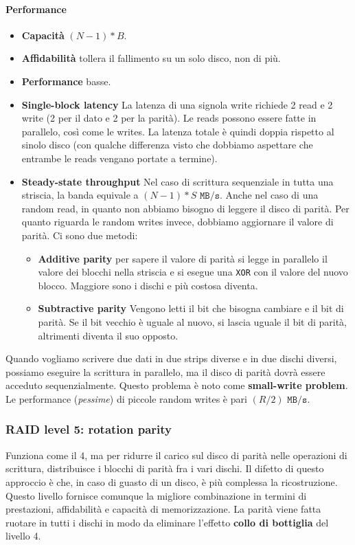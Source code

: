 \documentclass[12pt, letterpaper]{article}
\begin{document}
				\paragraph{Performance}
					\begin{itemize}
						\item \textbf{Capacità} $(N-1)*B$.
						\item \textbf{Affidabilità} tollera il fallimento su un solo disco, non di più.
						\item \textbf{Performance} basse.
						\item \textbf{Single-block latency} La latenza di una signola write richiede 2 read e 2 write (2 per il dato e 2 per la parità). Le reads possono essere fatte in parallelo, così come le writes. La latenza totale è quindi doppia rispetto al sinolo disco (con qualche differenza visto che dobbiamo aspettare che entrambe le reads vengano portate a termine).
						\item \textbf{Steady-state throughput} Nel caso di scrittura sequenziale in tutta una striscia, la banda equivale a $(N-1)*S \texttt{ MB/s}$. Anche nel caso di una random read, in quanto non abbiamo bisogno di leggere il disco di parità. Per quanto riguarda le random writes invece, dobbiamo aggiornare il valore di parità. Ci sono due metodi: 
							\begin{itemize}
								\item \textbf{Additive parity} per sapere il valore di parità si legge in parallelo il valore dei blocchi nella striscia e si esegue una \texttt{XOR} con il valore del nuovo blocco. Maggiore sono i dischi e più costosa diventa.
								\item \textbf{Subtractive parity} Vengono letti il bit che bisogna cambiare e il bit di parità. Se il bit vecchio è uguale al nuovo, si lascia uguale il bit di parità, altrimenti diventa il suo opposto.
							\end{itemize}
					\end{itemize}
					Quando vogliamo scrivere due dati in due strips diverse e in due dischi diversi, possiamo eseguire la scrittura in parallelo, ma il disco di parità dovrà essere acceduto sequenzialmente. Questo problema è noto come \textbf{small-write problem}. Le performance (\textit{pessime}) di piccole random writes è pari  $(R/2) \texttt{ MB/s}$. 
				
			\subsubsection{RAID level 5: rotation parity}
				Funziona come il 4, ma per ridurre il carico sul disco di parità nelle operazioni di scrittura, distribuisce i blocchi di parità fra i vari dischi. Il difetto di questo approccio è che, in caso di guasto di un disco, è più complessa la ricostruzione. Questo livello fornisce comunque la migliore combinazione in termini di prestazioni, affidabilità e capacità di memorizzazione. La parità viene fatta ruotare in tutti i dischi in modo da eliminare l'effetto \textbf{collo di bottiglia} del livello 4.
				
\end{document}
